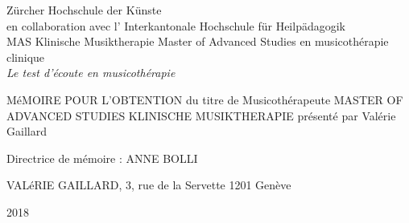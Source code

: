 
\begin{titlepage}
 \begin{center}
    \Large
     Zürcher Hochschule der Künste\\
 	en collaboration avec l' Interkantonale Hochschule für Heilpädagogik \\
	 MAS Klinische Musiktherapie Master of Advanced Studies en musicothérapie clinique\\
  \vfill
  { \LARGE
\emph{Le test d'écoute en musicothérapie }\\ \bigskip
	 }
 \vfill
 \end{center}
MéMOIRE  POUR L'OBTENTION  du titre de
Musicothérapeute
MASTER OF ADVANCED STUDIES KLINISCHE MUSIKTHERAPIE présenté par Valérie Gaillard

{\large Directrice de mémoire : ANNE  BOLLI}


 {\large

	 VALéRIE GAILLARD, 3, rue de la Servette   \hfill 1201 Genève\\
	 \rule{0mm}{1pt} \hfill  2018}

\end{titlepage}
